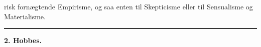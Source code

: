 \documentclass[12pt,a4paper]{book}
\newcommand{\divrule}{\begin{center}\rule{2cm}{0.4pt}\end{center}}
\begin{document}
%
risk fornægtende Empirisme, og saa enten til Skepticisme eller
til Sensualisme og Materialisme.

\divrule

\begin{center}
  \textbf{2. Hobbes.}
\end{center}
\end{document}
